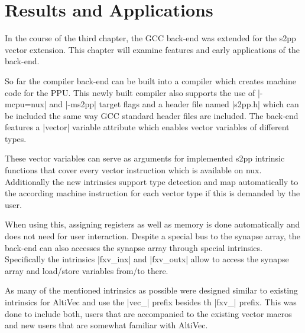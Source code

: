 \chapter{Results and Applications}
\label{ch:results}
In the course of the third chapter, the GCC back-end was extended for the s2pp vector extension.
This chapter will examine features and early applications of the back-end.

So far the compiler back-end can be built into a compiler which creates machine code for the PPU.
This newly built compiler also supports the use of |-mcpu=nux| and |-ms2pp| target flags and a header file named |s2pp.h| which can be included the same way GCC standard header files are included.
The back-end features a |vector| variable attribute which enables vector variables of different types.

These vector variables can serve as arguments for implemented s2pp intrinsic functions that cover every vector instruction which is available on nux.
Additionally the new intrinsics support type detection and map automatically to the according machine instruction for each vector type if this is demanded by the user.

When using this, assigning registers as well as memory is done automatically and does not need for user interaction.
Despite a special bus to the synapse array, the back-end can also accesses the synapse array through special intrinsics.
Specifically the intrinsics |fxv_inx| and |fxv_outx| allow to access the synapse array and load/store variables from/to there.

As many of the mentioned intrinsics as possible were designed similar to existing intrinsics for AltiVec and use the |vec_| prefix besides th |fxv_| prefix.
This was done to include both, users that are accompanied to the existing vector macros and new users that are somewhat familiar with AltiVec.

